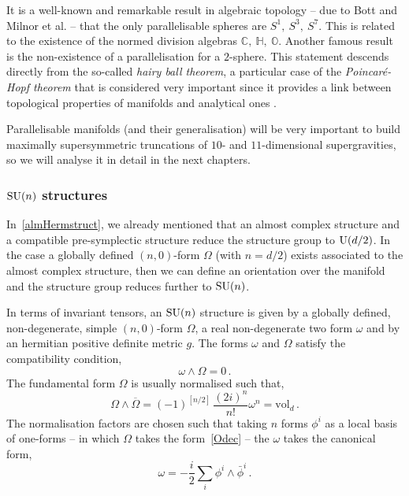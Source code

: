 \documentclass[debug]{phd}
\begin{document}
						It is a well-known and remarkable result in algebraic topology -- due to Bott and Milnor et al. \cite{bott, Kervaire} -- that the only parallelisable spheres are $S^1,\ S^3,\ S^7$. This is related to the existence of the normed division algebras $\mathbb{C},\ \mathbb{H},\ \mathbb{O}$. 
						Another famous result is the non-existence of a parallelisation for a $2$-sphere. 
						This statement descends directly from the so-called \emph{hairy ball theorem}, a particular case of the \emph{Poincaré-Hopf theorem} that is considered very important since it provides a link between topological properties of manifolds and analytical ones \cite{adams, Hairy}.						
						
						Parallelisable manifolds (and their generalisation) will be very important to build maximally supersymmetric truncations of $10$- and $11$-dimensional supergravities, so we will analyse it in detail in the next chapters.
					\subsubsection{\texorpdfstring{$\mathrm{SU}(n)$ structures}{SU(n) structures}}
						In~\cref{almHermstruct}, we already mentioned that an almost complex structure and a compatible pre-symplectic structure reduce the structure group to $\mathrm{U}(d/2)$.
						In the case a globally defined $(n,0)$-form $\Omega$ (with $n = d/2$) exists associated to the almost complex structure, then we can define an orientation over the manifold and the structure group reduces further to $\mathrm{SU}(n)$.
						
						In terms of invariant tensors, an $\mathrm{SU}(n)$ structure is given by a globally defined, non-degenerate, simple $(n,0)$-form $\Omega$, a real non-degenerate two form $\omega$ and by an hermitian positive definite metric $g$.
						The forms $\omega$ and $\Omega$ satisfy the compatibility condition,
								\begin{equation}\label{compatib1}
									\omega \wedge \Omega = 0\, .
								\end{equation}
						The fundamental form $\Omega$ is usually normalised such that,
								\begin{equation}\label{compatib2}
									\Omega \wedge \overline{\Omega} = (-1)^{[n/2]}\, \frac{(2i)^{n}}{n!} \omega^n = \mathrm{vol}_{d}\, .
								\end{equation}
						The normalisation factors are chosen such that taking $n$ forms $\phi^i$ as a local basis of one-forms -- in which $\Omega$ takes the form~\eqref{Odec} -- the $\omega$ takes the canonical form,
								\begin{equation}
									\omega = - \frac{i}{2} \sum_{i} \phi^i \wedge \bar{\phi}^i\, .
								\end{equation}
						
\end{document}
